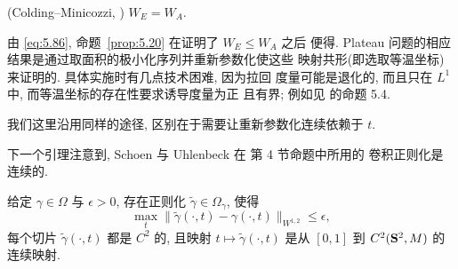 \begin{proposition}
\label{prop:5.20}
(Colding--Minicozzi, \cite{CM27}) $W_E=W_A$.
\end{proposition}

由 \eqref{eq:5.86}, 命题~\ref{prop:5.20} 在证明了 $W_E\leq W_A$ 之后
便得. Plateau 问题的相应结果是通过取面积的极小化序列并重新参数化使这些
映射共形(即选取等温坐标)来证明的. 具体实施时有几点技术困难, 因为拉回
度量可能是退化的, 而且只在 $L^1$ 中, 而等温坐标的存在性要求诱导度量为正
且有界; 例如见 \cite{ScW} 的命题 5.4.

我们这里沿用同样的途径, 区别在于需要让重新参数化连续依赖于 $t$.

下一个引理注意到, Schoen 与 Uhlenbeck 在 \cite{ScU2} 第 4 节命题中所用的
卷积正则化是连续的.

\begin{lemma}
\label{lem:5.21}
给定 $\gamma\in\Omega$ 与 $\epsilon>0$, 存在正则化 $\tilde{\gamma}\in
\Omega_\gamma$, 使得
\begin{equation}
\max_t\|\tilde{\gamma}(\cdot,t)-\gamma(\cdot,t)\|_{W^{1,2}}\leq\epsilon,
\label{eq:5.87}
\end{equation}
每个切片 $\tilde{\gamma}(\cdot,t)$ 都是 $C^2$ 的, 且映射
$t\mapsto\tilde{\gamma}(\cdot,t)$ 是从 $[0,1]$ 到
$C^2(\mathbf{S}^2,M)$ 的连续映射.
\end{lemma}


